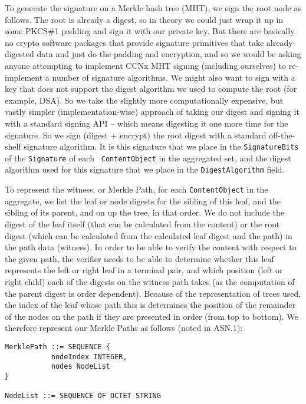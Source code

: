 To generate the signature on a Merkle hash tree (MHT), we sign the
root node as follows. The root is already a digest, so in theory we
could just wrap it up in some PKCS\#1 padding and sign it with our
private key. But there are basically no crypto software packages that
provide signature primitives that take already-digested data and just
do the padding and encryption, and so we would be asking anyone
attempting to implement CCNx MHT signing (including ourselves) to
re-implement a number of signature algorithms. We might also want to
sign with a key that does not support the digest algorithm we used to
compute the root (for example, DSA). So we take the slightly more
computationally expensive, but vastly simpler (implementation-wise)
approach of taking our digest and signing it with a standard signing
API -- which means digesting it one more time for the signature. So
we sign (digest + encrypt) the root digest with a standard
off-the-shelf signature algorithm. It is this signature that we place
in the {\tt SignatureBits} of the {\tt Signature} of each {\tt
  ContentObject} in the aggregated set, and the digest algorithm used
for this signature that we place in the {\tt DigestAlgorithm} field.

To represent the witness, or Merkle Path, for each {\tt ContentObject}
in the aggregate, we list the leaf or node digests for the sibling of
this leaf, and the sibling of its parent, and on up the tree, in that
order. We do not include the digest of the leaf itself (that can be
calculated from the content) or the root digest (which can be
calculated from the calculated leaf digest and the path) in the path
data (witness). In order to be able to verify the content with respect
to the given path, the verifier needs to be able to determine whether
this leaf represents the left or right leaf in a terminal pair, and
which position (left or right child) each of the digests on the
witness path takes (as the computation of the parent digest is order
dependent). Because of the representation of trees used, the index of
the leaf whose path this is determines the position of the remainder
of the nodes on the path if they are presented in order (from top to
bottom). We therefore represent our Merkle Paths as follows (noted in
ASN.1):

\begin{verbatim}
MerklePath ::= SEQUENCE {       
           nodeIndex INTEGER,   
           nodes NodeList       
}                           

NodeList ::= SEQUENCE OF OCTET STRING 
\end{verbatim}

